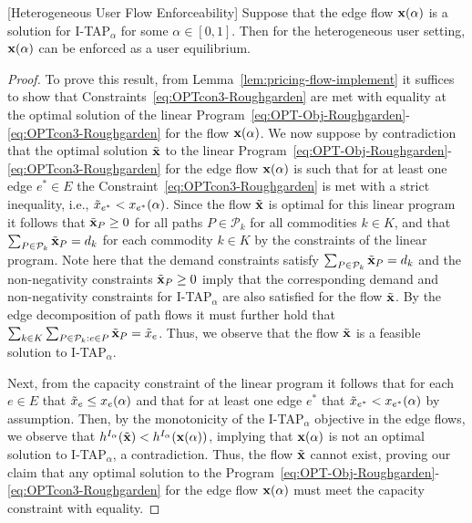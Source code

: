 \documentclass{article}
\newif\ifarxiv   %
\begin{document}
\begin{lemma} \label{lem:single-od-result} [Heterogeneous User Flow Enforceability]
Suppose that the edge flow $\mathbf{x}(\alpha)$ is a solution for I-TAP$_\alpha$ for some $\alpha\in [0,1]$. Then for the heterogeneous user setting, $\mathbf{x}(\alpha)$ can be enforced as a user equilibrium.
\end{lemma}
\ifarxiv 
\begin{proof}
To prove this result, from Lemma~\ref{lem:pricing-flow-implement} it suffices to show that Constraints~\eqref{eq:OPTcon3-Roughgarden} are met with equality at the optimal solution of the linear Program~\eqref{eq:OPT-Obj-Roughgarden}-\eqref{eq:OPTcon3-Roughgarden} for the flow $\mathbf{x}(\alpha)$. We now suppose by contradiction that the optimal solution $\Tilde{\mathbf{x}}$ to the linear Program~\eqref{eq:OPT-Obj-Roughgarden}-\eqref{eq:OPTcon3-Roughgarden} for the edge flow $\mathbf{x}(\alpha)$ is such that for at least one edge $e^*\in E$ the Constraint~\eqref{eq:OPTcon3-Roughgarden} is met with a strict inequality, i.e., $\Tilde{x}_{e^*}<x_{e^*}(\alpha)$. Since the flow $\Tilde{\mathbf{x}}$ is optimal for this linear program it follows that $\Tilde{\mathbf{x}}_{P} \geq 0$ for all paths $P \in \mathcal{P}_k$ for all commodities $k \in K$, and that $\sum_{P \in \mathcal{P}_k} \Tilde{\mathbf{x}}_{P} = d_k$ for each commodity $k \in K$ by the constraints of the linear program. Note here that the demand constraints satisfy $\sum_{P \in \mathcal{P}_k} \Tilde{\mathbf{x}}_{P} = d_k$ and the non-negativity constraints $\Tilde{\mathbf{x}}_{P} \geq 0$ imply that the corresponding demand and non-negativity constraints for I-TAP$_{\alpha}$ are also satisfied for the flow $\Tilde{\mathbf{x}}$. By the edge decomposition of path flows it must further hold that $\sum_{k \in K} \sum_{P \in \mathcal{P}_k: e \in P} \Tilde{\mathbf{x}}_{P} = \Tilde{x}_e$. Thus, we observe that the flow $\Tilde{\mathbf{x}}$ is a feasible solution to I-TAP$_{\alpha}$. 

Next, from the capacity constraint of the linear program it follows that for each $e \in E$ that $\Tilde{x}_e \leq x_e(\alpha)$ and that for at least one edge $e^*$ that $\Tilde{x}_{e^*}<x_{e^*}(\alpha)$ by assumption. Then, by the monotonicity of the I-TAP$_{\alpha}$ objective in the edge flows, we observe that $h^{I_{\alpha}}(\Tilde{\mathbf{x}}) < h^{I_{\alpha}}(\mathbf{x}(\alpha))$, implying that $\mathbf{x}(\alpha)$ is not an optimal solution to I-TAP$_{\alpha}$, a contradiction. Thus, the flow $\Tilde{\mathbf{x}}$ cannot exist, proving our claim that any optimal solution to the Program~\eqref{eq:OPT-Obj-Roughgarden}-\eqref{eq:OPTcon3-Roughgarden} for the edge flow $\mathbf{x}(\alpha)$ must meet the capacity constraint with equality.
\end{proof}
\end{document}
